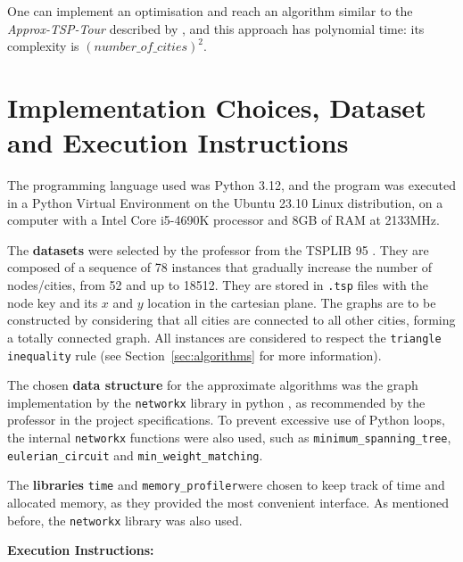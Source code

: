 \documentclass[12pt]{article}
\begin{document}
One can implement an optimisation and reach an algorithm similar to the \textit{Approx-TSP-Tour} 
described by \cite{cormen}, and this approach has polynomial time: its complexity is $(number\_of\_cities)^2$.

\section{Implementation Choices, Dataset and Execution Instructions} \label{sec:implementation}

The programming language used was Python 3.12, and the program was executed 
in a Python Virtual Environment on the Ubuntu 23.10 Linux distribution, on a computer with a 
Intel Core i5-4690K processor and 8GB of RAM at 2133MHz.

The \textbf{datasets} were selected by the professor from the TSPLIB 95 \cite{dataset_lib}. They are composed of a sequence of 78 instances that gradually increase the number of nodes/cities, from 52 and up to 18512. They are 
stored in \texttt{.tsp} files with the node key and its $x$ and $y$ location in the cartesian plane. 
The graphs are to be constructed by considering that all cities are connected to all other cities, forming 
a totally connected graph. All instances are considered to respect the \texttt{triangle inequality} rule (see Section~\ref{sec:algorithms} for more information).

The chosen \textbf{data structure} for the approximate algorithms was the graph implementation 
by the \texttt{networkx} library in python \cite{networkx_docs}, as recommended by 
the professor in the project specifications. To prevent excessive use of Python loops, 
the internal \texttt{networkx} functions were also used, such as \texttt{minimum\_spanning\_tree}, 
\texttt{eulerian\_circuit} and \texttt{min\_weight\_matching}.

The \textbf{libraries} \texttt{time} and \texttt{memory\_profiler}\footnotemark were chosen to keep track of time 
and allocated memory, as they provided the most convenient interface. As mentioned before, the \texttt{networkx} library was also used. 


\textbf{Execution Instructions:}
\end{document}
